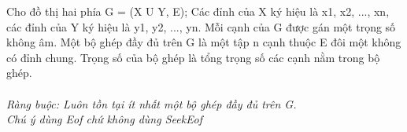 Cho đồ thị hai phía G = (X U Y, E); Các đỉnh của X ký hiệu là x1, x2, ..., xn, các đỉnh của Y ký hiệu là y1, y2, ..., yn. Mỗi cạnh của G được gán một trọng số không âm. Một bộ ghép đầy đủ trên G là một tập n cạnh thuộc E đôi một không có đỉnh chung. Trọng số của  bộ ghép là tổng trọng số các cạnh nằm trong bộ ghép.   
\\
\\\textit{    Ràng buộc: Luôn tồn tại ít nhất một bộ ghép đầy đủ trên G.   }
\\\textit{    Chú ý dùng         Eof        chứ không dùng         SeekEof       }